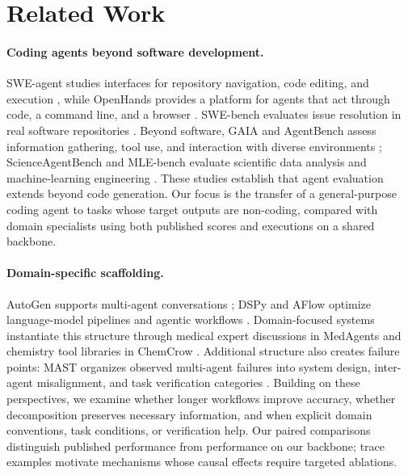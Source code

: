 \section{Related Work}
\label{sec:related}

\paragraph{Coding agents beyond software development.}
SWE-agent studies interfaces for repository navigation, code editing, and execution
\citep{yang2024sweagent}, while OpenHands provides a platform for agents that act through
code, a command line, and a browser \citep{wang2025openhands}. SWE-bench evaluates issue
resolution in real software repositories \citep{jimenez2024swebench}. Beyond software,
GAIA and AgentBench assess information gathering, tool use, and interaction with diverse
environments \citep{mialon2024gaia,liu2024agentbench}; ScienceAgentBench and MLE-bench
evaluate scientific data analysis and machine-learning engineering
\citep{chen2025scienceagentbench,chan2025mlebench}. These studies establish that agent
evaluation extends beyond code generation. Our focus is the transfer of a general-purpose
coding agent to tasks whose target outputs are non-coding, compared with domain specialists
using both published scores and executions on a shared backbone.

\paragraph{Domain-specific scaffolding.}
AutoGen supports multi-agent conversations \citep{wu2024autogen}; DSPy and AFlow optimize
language-model pipelines and agentic workflows \citep{khattab2024dspy,zhang2025aflow}.
Domain-focused systems instantiate this structure through medical expert discussions in
MedAgents \citep{tang2024medagents} and chemistry tool libraries in ChemCrow
\citep{bran2024chemcrow}. Additional structure also creates failure points: MAST organizes
observed multi-agent failures into system design, inter-agent misalignment, and task
verification categories \citep{cemri2025mast}. Building on these perspectives, we examine
whether longer workflows improve accuracy, whether decomposition preserves necessary
information, and when explicit domain conventions, task conditions, or verification help.
Our paired comparisons distinguish published performance from performance on our backbone;
trace examples motivate mechanisms whose causal effects require targeted ablations.

